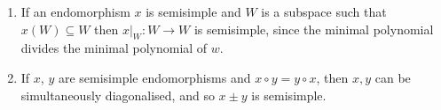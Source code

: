 \begin{enumerate}
	\item If an endomorphism $x$ is semisimple  and $W$ is a subspace such that
		$x(W) \subseteq W$ then $x|_W\colon W\to W$ is semisimple, since the
		minimal polynomial divides the minimal polynomial of $w$.
	\item If $x$, $y$ are semisimple endomorphisms and $x \circ y = y \circ x$,
		then $x, y$ can be simultaneously diagonalised, and so $x\pm y$ is
		semisimple.
\end{enumerate}
